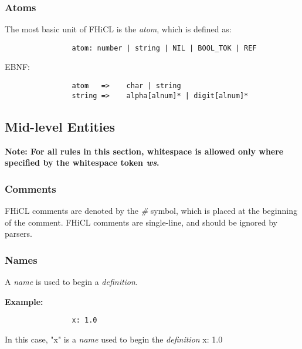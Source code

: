 \documentclass{memarticle}
\begin{document}
		\subsubsection{Atoms}
			The most basic unit of FHiCL is the \emph{atom},
			which is defined as: 
			\begin{verbatim}
				atom: number | string | NIL | BOOL_TOK | REF
			\end{verbatim}
			\vspace{1mm}
			EBNF:
			\begin{verbatim}
				atom   =>    char | string
				string =>    alpha[alnum]* | digit[alnum]*
			\end{verbatim}
			
	\subsection{Mid-level Entities}
		\bf Note: \rm For all rules in this section,
		whitespace is allowed only where specified by the whitespace token \emph{ws}.
		\subsubsection{Comments}
			FHiCL comments are denoted by the \emph{\#} symbol,
			which is placed at the beginning of the comment.
			FHiCL comments are single-line,
			and should be ignored by parsers.
		\subsubsection{Names}
			A \emph{name} is used to begin a \emph{definition}.
			\vspace{1mm}
			\par\bf{Example:}
			\rm
			\begin{verbatim}
				x: 1.0
			\end{verbatim}
			\vspace{1mm}
			In this case, 
			"x" is a \emph{name} 
			used to begin the \emph{definition} x: 1.0
\end{document}
